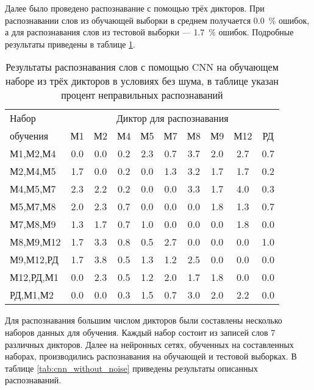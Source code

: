 Далее было проведено распознавание с помощью трёх дикторов.
При распознавании слов из обучающей выборки в среднем получается 0.0~\% ошибок, а для распознавания слов из тестовой выборки --- 1.7~\% ошибок.
Подробные результаты приведены в таблице \ref{tab:cnn_3dictor}.

\begin{table}[h]
	\centering
	\caption{Результаты распознавания слов с помощью CNN на обучающем наборе из трёх дикторов в условиях без шума, в таблице указан процент неправильных распознаваний}
	\label{tab:cnn_3dictor}
	\begin{tabular}{| l | c | c | c | c | c | c | c | c | c |}
		\hline
		Набор & \multicolumn{9}{c|}{Диктор для распознавания} \\
		\hhline{~---------}
		обучения  & \phantom{0}М1\phantom{0} & \phantom{0}М2\phantom{0} & \phantom{0}М4\phantom{0} & \phantom{0}М5\phantom{0} & \phantom{0}М7\phantom{0} & \phantom{0}М8\phantom{0} & \phantom{0}М9\phantom{0} & \phantom{0}М12\phantom{0} & \phantom{0}РД\phantom{0} \\
		\hline
		М1,М2,М4  & 0.0 & 0.0 & 0.2 & 2.3 & 0.7 & 3.7 & 2.0 & 2.7 & 0.7 \\
		М2,М4,М5  & 1.7 & 0.0 & 0.2 & 0.0 & 1.3 & 3.2 & 1.7 & 1.7 & 0.2 \\
		М4,М5,М7  & 2.3 & 2.2 & 0.2 & 0.0 & 0.0 & 3.3 & 1.7 & 4.0 & 0.3 \\
		М5,М7,М8  & 2.0 & 2.3 & 0.7 & 0.0 & 0.0 & 0.0 & 1.8 & 1.3 & 0.7 \\
		М7,М8,М9  & 1.3 & 1.7 & 0.7 & 1.0 & 0.0 & 0.0 & 0.0 & 1.8 & 0.0 \\
		М8,М9,М12 & 1.7 & 3.3 & 0.8 & 0.5 & 2.7 & 0.0 & 0.0 & 0.0 & 1.0 \\
		М9,М12,РД & 1.7 & 3.8 & 0.5 & 1.3 & 1.2 & 2.5 & 0.0 & 0.0 & 0.0 \\
		М12,РД,М1 & 0.0 & 2.3 & 0.5 & 1.2 & 2.0 & 1.7 & 1.8 & 0.0 & 0.0 \\
		РД,М1,М2  & 0.0 & 0.0 & 0.3 & 1.5 & 0.7 & 3.0 & 2.0 & 2.2 & 0.0 \\
		\hline
	\end{tabular}
\end{table}

Для распознавания большим числом дикторов были составлены несколько наборов данных для обучения.
Каждый набор состоит из записей слов 7 различных дикторов.
Далее на нейронных сетях, обученных на составленных наборах, производились распознавания на обучающей и тестовой выборках.
В таблице \ref{tab:cnn_without_noise} приведены результаты описанных распознаваний.

